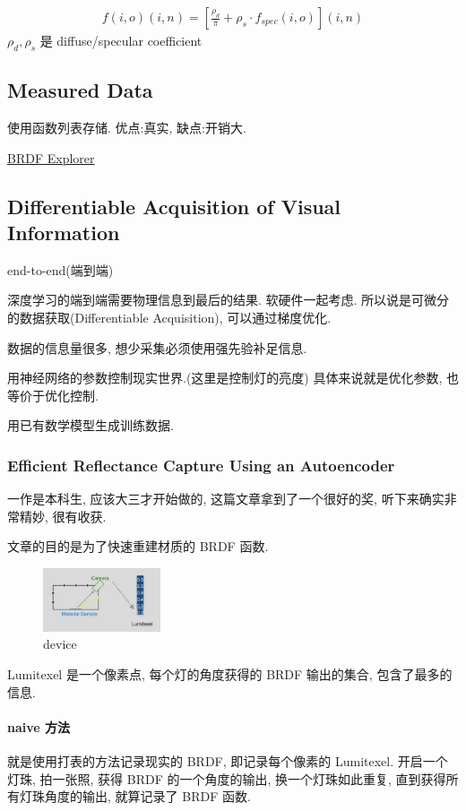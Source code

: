 \begin{align*}
    f(i,o)(i,n)=\left[ \frac{\rho_d}{\pi}+\rho_s\cdot f_{spec}(i,o) \right](i,n)
\end{align*}
$\rho_d, \rho_s$ 是 diffuse/specular coefficient

\subsection{Measured Data}
使用函数列表存储. 优点:真实, 缺点:开销大.


\href{http://www.disneyanimation.com/technology/brdf.html}{BRDF Explorer}


\subsection{Differentiable Acquisition of Visual Information}
end-to-end(端到端) 

深度学习的端到端需要物理信息到最后的结果. 软硬件一起考虑. 所以说是可微分的数据获取(Differentiable Acquisition), 可以通过梯度优化. 

数据的信息量很多, 想少采集必须使用强先验补足信息. 

用神经网络的参数控制现实世界.(这里是控制灯的亮度) 具体来说就是优化参数, 也等价于优化控制. 

用已有数学模型生成训练数据. 

\subsubsection{Efficient Reflectance Capture Using an Autoencoder}
一作是本科生, 应该大三才开始做的, 这篇文章拿到了一个很好的奖, 听下来确实非常精妙, 很有收获.


文章的目的是为了快速重建材质的 BRDF 函数. 

\begin{figure}[!htb]
    \centering
    \includegraphics[width=0.309\textwidth]{pic/ACG4/device}
    \caption{device}
\end{figure}

Lumitexel 是一个像素点, 每个灯的角度获得的 BRDF 输出的集合, 包含了最多的信息. 


\paragraph{naive 方法} 就是使用打表的方法记录现实的 BRDF, 即记录每个像素的 Lumitexel. 开启一个灯珠, 拍一张照, 获得 BRDF 的一个角度的输出, 换一个灯珠如此重复, 直到获得所有灯珠角度的输出, 就算记录了 BRDF 函数. 

